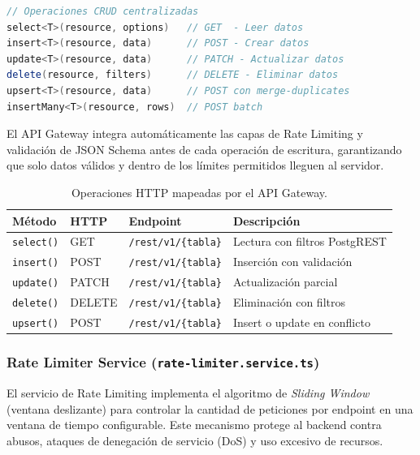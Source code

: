 \documentclass[12pt,a4paper]{article}
\begin{document}
\begin{lstlisting}[language=Java, caption={Métodos principales del API Gateway Service.}, label={lst:api-gateway}]
// Operaciones CRUD centralizadas
select<T>(resource, options)   // GET  - Leer datos
insert<T>(resource, data)      // POST - Crear datos
update<T>(resource, data)      // PATCH - Actualizar datos
delete(resource, filters)      // DELETE - Eliminar datos
upsert<T>(resource, data)      // POST con merge-duplicates
insertMany<T>(resource, rows)  // POST batch
\end{lstlisting}

El API Gateway integra automáticamente las capas de Rate Limiting y validación de JSON Schema antes de cada operación de escritura, garantizando que solo datos válidos y dentro de los límites permitidos lleguen al servidor.

\begin{table}[H]
    \centering
    \caption{Operaciones HTTP mapeadas por el API Gateway.}
    \label{tab:api-operations}
    \begin{tabular}{@{}llll@{}}
        \toprule
        \textbf{Método} & \textbf{HTTP} & \textbf{Endpoint} & \textbf{Descripción} \\
        \midrule
        \texttt{select()} & GET & \texttt{/rest/v1/\{tabla\}} & Lectura con filtros PostgREST \\
        \texttt{insert()} & POST & \texttt{/rest/v1/\{tabla\}} & Inserción con validación \\
        \texttt{update()} & PATCH & \texttt{/rest/v1/\{tabla\}} & Actualización parcial \\
        \texttt{delete()} & DELETE & \texttt{/rest/v1/\{tabla\}} & Eliminación con filtros \\
        \texttt{upsert()} & POST & \texttt{/rest/v1/\{tabla\}} & Insert o update en conflicto \\
        \bottomrule
    \end{tabular}
\end{table}

\subsubsection{Rate Limiter Service (\texttt{rate-limiter.service.ts})}

El servicio de Rate Limiting implementa el algoritmo de \textit{Sliding Window} (ventana deslizante) para controlar la cantidad de peticiones por endpoint en una ventana de tiempo configurable. Este mecanismo protege al backend contra abusos, ataques de denegación de servicio (DoS) y uso excesivo de recursos.
\end{document}
